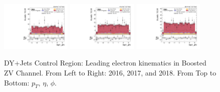 \begin{figure}[!ht]
  \includegraphics[width=0.30\textwidth]{analysis_plots/2016_zv/cr_vjets_e/lep1_phi.pdf}
  \includegraphics[width=0.30\textwidth]{analysis_plots/2017_zv/cr_vjets_e/lep1_phi.pdf}
  \includegraphics[width=0.30\textwidth]{analysis_plots/2018_zv/cr_vjets_e/lep1_phi.pdf} \\
  \caption[DY+Jets Control Region: Leading electron kinematics in Boosted ZV Channel]%
  {DY+Jets Control Region: Leading electron kinematics in Boosted ZV Channel. From Left to Right: 2016,
    2017, and 2018. From Top to Bottom: \( p_T \), \( \eta \), \( \phi \).}%
  \label{fig:zv-cr-vjets-e-lep1-pt-eta-phi}
\end{figure}


